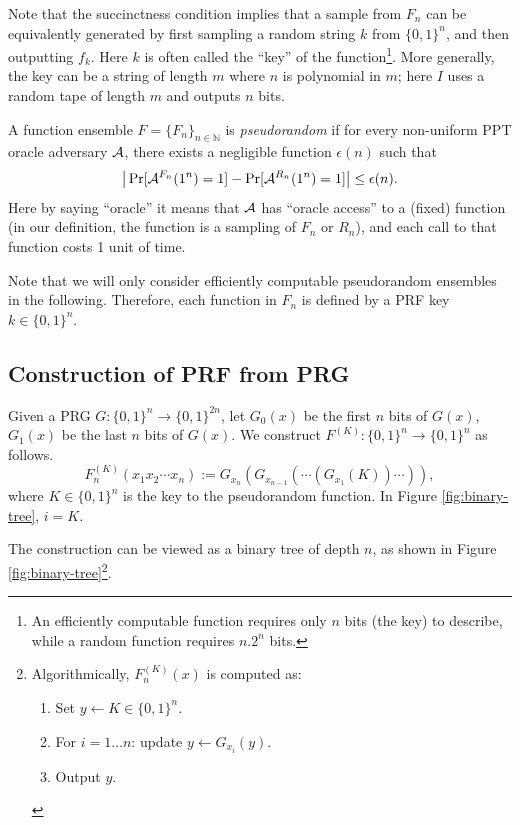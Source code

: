 Note that the succinctness condition implies that a sample from $F_n$ can be equivalently generated by first sampling a random string $k$ from $\{0, 1\}^n$, and then outputting $f_k$. Here $k$ is often called the ``key'' of the function\footnote{An efficiently computable function requires only $n$ bits (the key) to describe, while a random function requires $n.2^n$ bits.}. More generally, the key can be a string of length $m$ where $n$ is polynomial in $m$; here $I$ uses a random tape of length $m$ and outputs $n$ bits. %

\begin{definition}
    A function ensemble $F = \{F_n\}_{n \in \mathbb{N}}$ is \emph{pseudorandom} if
    for every non-uniform PPT oracle adversary $\mathcal{A}$, there exists a negligible function $\epsilon(n)$ such that
    \[
        \big| \Pr[\mathcal{A}^{F_n} (1^n) = 1] - \Pr[\mathcal{A}^{R_n} (1^n) = 1]  \big| \leq \epsilon(n).
    \]
    Here by saying ``oracle'' it means that $\mathcal{A}$ has ``oracle access'' to a (fixed) function (in our definition, the function is a sampling of $F_n$ or $R_n$), and each call to that function costs 1 unit of time.
\end{definition}

Note that we will only consider efficiently computable pseudorandom ensembles in the following. Therefore, each function in $F_n$ is defined by a PRF key $k \in \{0, 1\}^n$.


\subsection{Construction of PRF from PRG}

\begin{construction}
    Given a PRG $G: \{0, 1\}^n \rightarrow \{0, 1\}^{2n}$,
    let $G_0(x)$ be the first $n$ bits of $G(x)$, $G_1(x)$ be the last $n$ bits of $G(x)$.
    We construct $F^{(K)}: \{0, 1\}^n \rightarrow \{0, 1\}^n$ as follows.
    \[
        F^{(K)}_n(x_1 x_2 \cdots x_n) := G_{x_n}(G_{x_{n-1}} (\cdots(G_{x_1}(K)) \cdots  )),
    \]
    where $K \in \{0,1\}^n$ is the key to the pseudorandom function. In Figure \ref{fig:binary-tree}, $i = K$.
\end{construction}
The construction can be viewed as a binary tree of depth $n$, as shown in Figure \ref{fig:binary-tree}\footnote{Algorithmically, $F_n^{(K)}(x)$ is computed as:
\begin{enumerate}
    \item Set $y \gets K \in \{0, 1\}^n$.
    \item For $i = 1 \dots n$: update $y \gets G_{x_i}(y)$.
    \item Output $y$.
\end{enumerate}
}.

